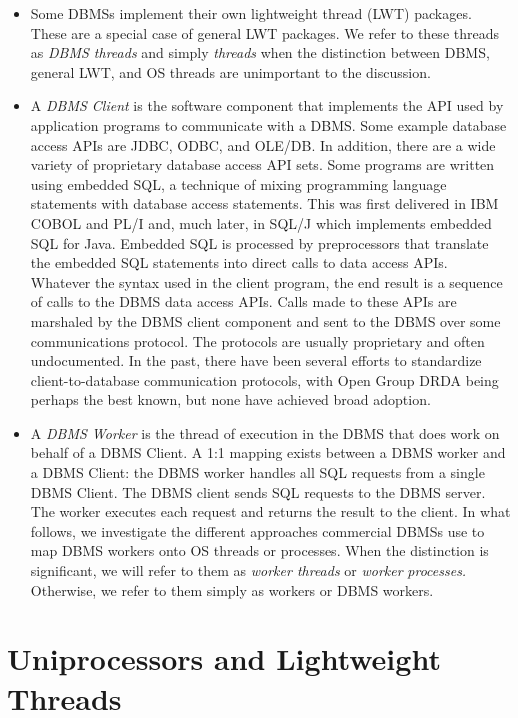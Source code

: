 \documentclass[a4paper,11pt,twoside,openright]{book}
\begin{document}
\begin{itemize}
\item
  Some DBMSs implement their own lightweight thread (LWT) packages.
  These are a special case of general LWT packages. We refer to these
  threads as \emph{DBMS threads} and simply \emph{threads} when the
  distinction between DBMS, general LWT, and OS threads are unimportant
  to the discussion.
\item
  A \emph{DBMS Client} is the software component that implements the API
  used by application programs to communicate with a DBMS. Some example
  database access APIs are JDBC, ODBC, and OLE/DB. In addition, there
  are a wide variety of proprietary database access API sets. Some
  programs are written using embedded SQL, a technique of mixing
  programming language statements with database access statements. This
  was first delivered in IBM COBOL and PL/I and, much later, in SQL/J
  which implements embedded SQL for Java. Embedded SQL is processed by
  preprocessors that translate the embedded SQL statements into direct
  calls to data access APIs. Whatever the syntax used in the client
  program, the end result is a sequence of calls to the DBMS data access
  APIs. Calls made to these APIs are marshaled by the DBMS client
  component and sent to the DBMS over some communications protocol. The
  protocols are usually proprietary and often undocumented. In the past,
  there have been several efforts to standardize client-to-database
  communication protocols, with Open Group DRDA being perhaps the best
  known, but none have achieved broad adoption.
\item
  A \emph{DBMS Worker} is the thread of execution in the DBMS that does
  work on behalf of a DBMS Client. A 1:1 mapping exists between a DBMS
  worker and a DBMS Client: the DBMS worker handles all SQL requests
  from a single DBMS Client. The DBMS client sends SQL requests to the
  DBMS server. The worker executes each request and returns the result
  to the client. In what follows, we investigate the different
  approaches commercial DBMSs use to map DBMS workers onto OS threads or
  processes. When the distinction is significant, we will refer to them
  as \emph{worker threads} or \emph{worker} \emph{processes.} Otherwise,
  we refer to them simply as workers or DBMS workers.
\end{itemize}

\hypertarget{uniprocessors-and-lightweight-threads}{%
\section{Uniprocessors and Lightweight
Threads}\label{uniprocessors-and-lightweight-threads}}
\end{document}
